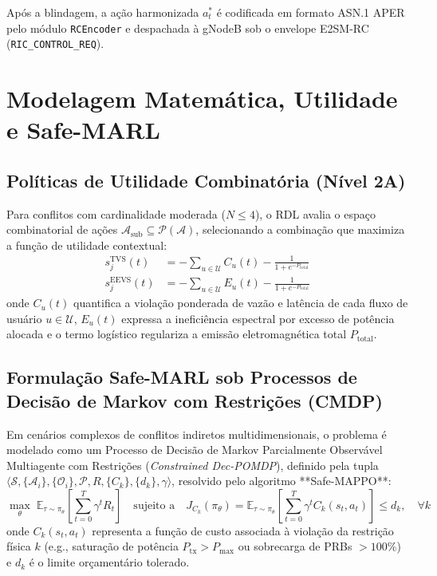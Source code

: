 \documentclass[12pt]{article}
\begin{document}
Após a blindagem, a ação harmonizada $a_t^*$ é codificada em formato ASN.1 APER pelo módulo \texttt{RCEncoder} e despachada à gNodeB sob o envelope E2SM-RC (\texttt{RIC\_CONTROL\_REQ}).

\section{Modelagem Matemática, Utilidade e Safe-MARL}
\label{sec:modelagem}

\subsection{Políticas de Utilidade Combinatória (Nível 2A)}

Para conflitos com cardinalidade moderada ($N \le 4$), o RDL avalia o espaço combinatorial de ações $\mathcal{A}_{\text{sub}} \subseteq \mathcal{P}(\mathcal{A})$, selecionando a combinação que maximiza a função de utilidade contextual:
\begin{align}
s_j^{\text{TVS}}(t) &= - \sum_{u \in \mathcal{U}} C_u(t) - \frac{1}{1 + e^{-P_{\text{total}}}} \label{eq:tvs} \\
s_j^{\text{EEVS}}(t) &= - \sum_{u \in \mathcal{U}} E_u(t) - \frac{1}{1 + e^{-P_{\text{total}}}} \label{eq:eevs}
\end{align}
onde $C_u(t)$ quantifica a violação ponderada de vazão e latência de cada fluxo de usuário $u \in \mathcal{U}$, $E_u(t)$ expressa a ineficiência espectral por excesso de potência alocada e o termo logístico regulariza a emissão eletromagnética total $P_{\text{total}}$.

\subsection{Formulação Safe-MARL sob Processos de Decisão de Markov com Restrições (CMDP)}

Em cenários complexos de conflitos indiretos multidimensionais, o problema é modelado como um Processo de Decisão de Markov Parcialmente Observável Multiagente com Restrições (\textit{Constrained Dec-POMDP}), definido pela tupla $\langle \mathcal{S}, \{\mathcal{A}_i\}, \{\mathcal{O}_i\}, \mathcal{P}, R, \{C_k\}, \{d_k\}, \gamma \rangle$, resolvido pelo algoritmo **Safe-MAPPO**:
\begin{equation}
\max_{\theta} \; \mathbb{E}_{\tau \sim \pi_\theta} \left[ \sum_{t=0}^T \gamma^t R_t \right] \quad \text{sujeito a} \quad J_{C_k}(\pi_\theta) = \mathbb{E}_{\tau \sim \pi_\theta} \left[ \sum_{t=0}^T \gamma^t C_k(s_t, a_t) \right] \le d_k, \quad \forall k
\end{equation}
onde $C_k(s_t, a_t)$ representa a função de custo associada à violação da restrição física $k$ (e.g., saturação de potência $P_{\text{tx}} > P_{\max}$ ou sobrecarga de PRBs $> 100\%$) e $d_k$ é o limite orçamentário tolerado.
\end{document}

